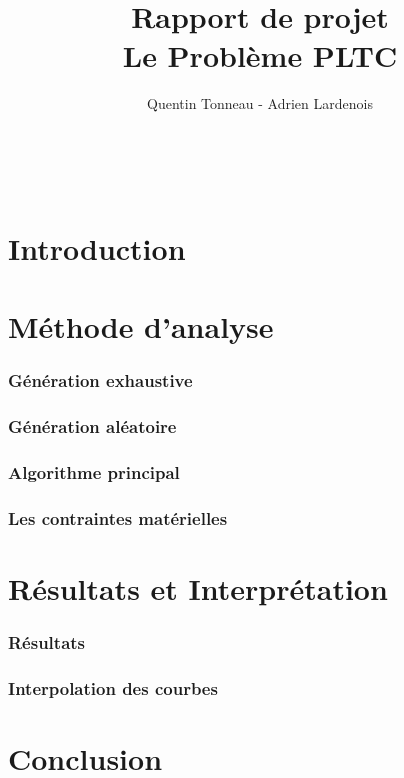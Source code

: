 \documentclass[a4paper,11pt,twoside]{report}
\title {Rapport de projet \\ Le Problème PLTC}
\author {Quentin Tonneau - Adrien Lardenois}
\date{}
\begin{document}
\pagestyle{plain}
\renewcommand\labelitemi{$\circ$}
\renewcommand\labelitemii{$\bullet$}
\tableofcontents
\newpage
\thispagestyle{empty} ~

{

	\fancyhead{}
	\fancyfoot{}
	\lfoot[\thepage]{}
	\rfoot[]{\thepage}
}

\part{Introduction}
 


 
\part{Méthode d'analyse}
   \section{Génération exhaustive}
      
   \section{Génération aléatoire}
      
   \section{Algorithme principal}
      
   \section{Les contraintes matérielles}
      
\part{Résultats et Interprétation}
  \section{Résultats}
  \section{Interpolation des courbes}
\part{Conclusion}
\end{document}
